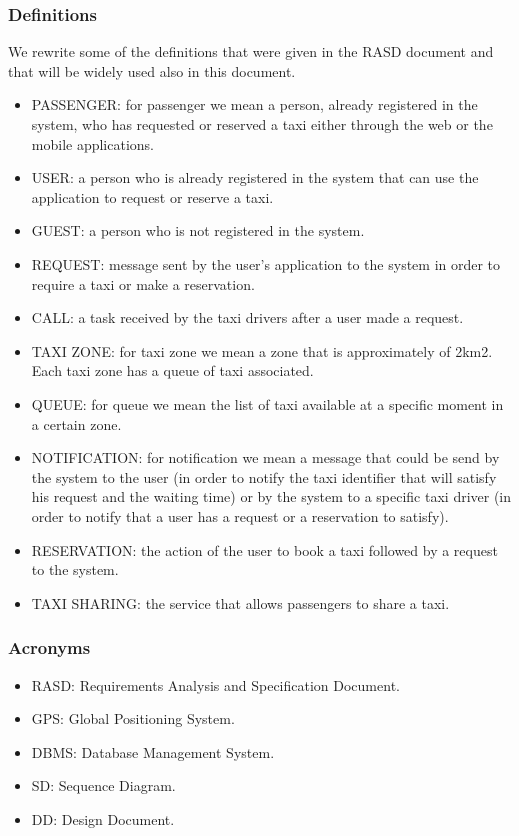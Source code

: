 \subsubsection{Definitions}
	We rewrite some of the definitions that were given in the RASD document and that will be widely used also in this document. 
	\begin{itemize}
		\item PASSENGER: for passenger we mean a person, already registered in the system, who has requested or reserved a taxi either through the web or the mobile applications.
		\item USER: a person who is already registered in the system that can use the application to request or reserve a taxi.
		\item GUEST:  a person who is not registered in the system.
		\item REQUEST: message sent by the user's application to the system in order to require a taxi or make a reservation.
		\item CALL: a task received by the taxi drivers after a user made a request.
		\item TAXI ZONE: for taxi zone we mean a zone that is approximately of 2km2. Each taxi zone has a queue of taxi associated. 
		\item QUEUE: for queue we mean the list of taxi available at a specific moment in a certain zone.
		\item NOTIFICATION: for notification we mean a message that could be send by the system to the user (in order to notify the taxi identifier that will satisfy his request and the waiting time) or by the system to a specific taxi driver (in order to notify that a user has a request or a reservation to satisfy).
		\item RESERVATION: the action of the user to book a taxi followed by a request to the system.
		\item TAXI SHARING: the service that allows passengers to share a taxi.
	\end{itemize}

\subsubsection{Acronyms}
	\begin{itemize}
	    \item RASD: Requirements Analysis and Specification Document.
		\item GPS: Global Positioning System.
		\item DBMS: Database Management System.
		\item SD: Sequence Diagram.
		\item DD: Design Document.
	\end{itemize}